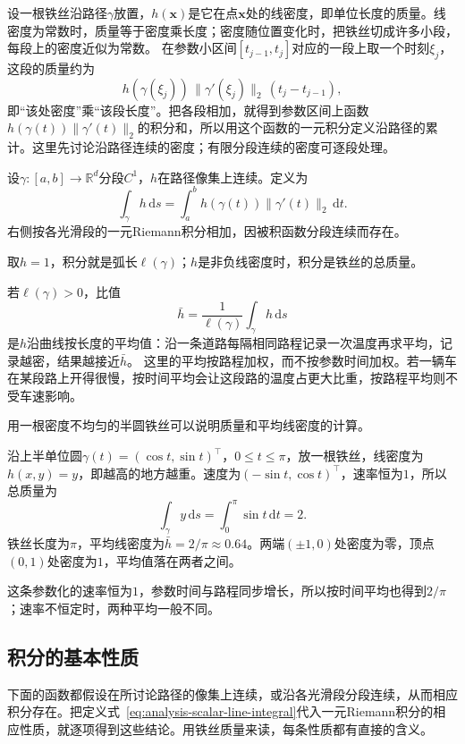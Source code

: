设一根铁丝沿路径$\gamma$放置，$h(\bm x)$是它在点$\bm x$处的线密度，即单位长度的质量。线密度为常数时，质量等于密度乘长度；密度随位置变化时，把铁丝切成许多小段，每段上的密度近似为常数。
在参数小区间$[t_{j-1},t_j]$对应的一段上取一个时刻$\xi_j$，这段的质量约为
\[
 h(\gamma(\xi_j))\,\lVert\gamma'(\xi_j)\rVert_2\,(t_j-t_{j-1}),
\]
即“该处密度”乘“该段长度”。把各段相加，就得到参数区间上函数$h(\gamma(t))\lVert\gamma'(t)\rVert_2$的积分和，所以用这个函数的一元积分定义沿路径的累计。这里先讨论沿路径连续的密度；有限分段连续的密度可逐段处理。
\begin{definition}[第一类路径积分]
设$\gamma:[a,b]\to\mathbb R^d$分段$C^1$，$h$在路径像集上连续。定义为
\begin{equation}
 \int_\gamma h\,\mathrm ds=\int_a^b h(\gamma(t))\|\gamma'(t)\|_2\,\mathrm dt.
 \label{eq:analysis-scalar-line-integral}
\end{equation}
右侧按各光滑段的一元Riemann积分相加，因被积函数分段连续而存在。
\end{definition}

取$h=1$，积分就是弧长$\ell(\gamma)$；$h$是非负线密度时，积分是铁丝的总质量。

若$\ell(\gamma)>0$，比值
\[
 \bar h=\frac1{\ell(\gamma)}\int_\gamma h\,\mathrm ds
\]
是$h$沿曲线按长度的平均值：沿一条道路每隔相同路程记录一次温度再求平均，记录越密，结果越接近$\bar h$。
这里的平均按路程加权，而不按参数时间加权。若一辆车在某段路上开得很慢，按时间平均会让这段路的温度占更大比重，按路程平均则不受车速影响。

用一根密度不均匀的半圆铁丝可以说明质量和平均线密度的计算。
\begin{example}[上半圆铁丝的质量与平均线密度]
\label{ex:analysis-semicircle-wire}
沿上半单位圆$\gamma(t)=(\cos t,\sin t)^\top$，$0\leq t\leq\pi$，放一根铁丝，线密度为$h(x,y)=y$，即越高的地方越重。速度为$(-\sin t,\cos t)^\top$，速率恒为$1$，所以总质量为
\[
 \int_\gamma y\,\mathrm ds=\int_0^\pi\sin t\,\mathrm dt=2.
\]
铁丝长度为$\pi$，平均线密度为$\bar h=2/\pi\approx0.64$。两端$(\pm1,0)$处密度为零，顶点$(0,1)$处密度为$1$，平均值落在两者之间。
\end{example}
这条参数化的速率恒为$1$，参数时间与路程同步增长，所以按时间平均也得到$2/\pi$；速率不恒定时，两种平均一般不同。

\subsection{积分的基本性质}

下面的函数都假设在所讨论路径的像集上连续，或沿各光滑段分段连续，从而相应积分存在。把定义式~\eqref{eq:analysis-scalar-line-integral}代入一元Riemann积分的相应性质，就逐项得到这些结论。用铁丝质量来读，每条性质都有直接的含义。


